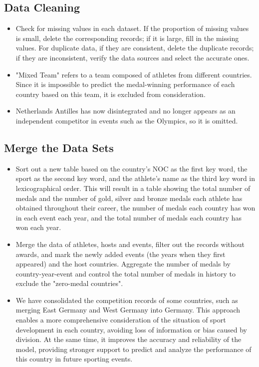 \documentclass{mcmthesis}  %
\begin{document}
\subsection{Data Cleaning}  %
\begin{itemize}  %
\item Check for missing values in each dataset. If the proportion of missing values is small, delete the corresponding records; if it is large, fill in the missing values. For duplicate data, if they are consistent, delete the duplicate records; if they are inconsistent, verify the data sources and select the accurate ones.
\item "Mixed Team" refers to a team composed of athletes from different countries. Since it is impossible to predict the medal-winning performance of each country based on this team, it is excluded from consideration.
\item Netherlands Antilles has now disintegrated and no longer appears as an independent competitor in events such as the Olympics, so it is omitted.
\end{itemize}  %

\subsection{Merge the Data Sets}  %
\begin{itemize}  %
\item Sort out a new table based on the country's NOC as the first key word, the sport as the second key word, and the athlete's name as the third key word in lexicographical order. This will result in a table showing the total number of medals and the number of gold, silver and bronze medals each athlete has obtained throughout their career, the number of medals each country has won in each event each year, and the total number of medals each country has won each year.
\item Merge the data of athletes, hosts and events, filter out the records without awards, and mark the newly added events (the years when they first appeared) and the host countries. Aggregate the number of medals by country-year-event and control the total number of medals in history to exclude the "zero-medal countries".
\item We have consolidated the competition records of some countries, such as merging East Germany and West Germany into Germany. This approach enables a more comprehensive consideration of the situation of sport development in each country, avoiding loss of information or bias caused by division. At the same time, it improves the accuracy and reliability of the model, providing stronger support to predict and analyze the performance of this country in future sporting events.
\end{itemize}  %
\end{document}
